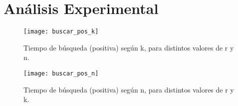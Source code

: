 \section{Análisis Experimental}

\begin{figure}
  \begin{center}
  \texttt{[image: buscar\_pos\_k]}
  \caption{Tiempo de búsqueda (positiva)
    según k, para distintos valores de r y n.}
  \label{fig:buscar-pos-segun-k}
  \end{center}
\end{figure}


\begin{figure}
  \begin{center}
  \texttt{[image: buscar\_pos\_n]}
  \caption{Tiempo de búsqueda (positiva)
    según n, para distintos valores de r y k.}
  \label{fig:buscar-pos-segun-k}
  \end{center}
\end{figure}